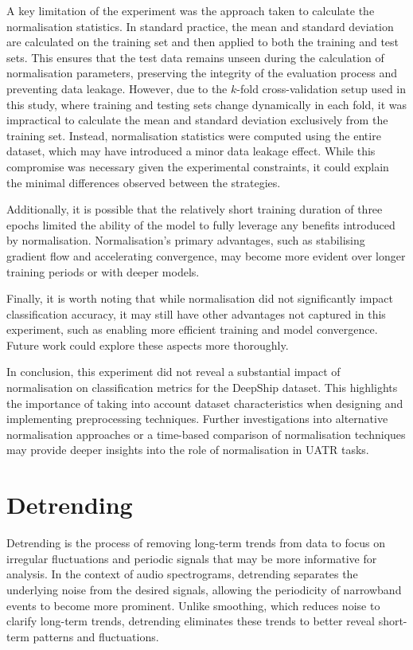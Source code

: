 A key limitation of the experiment was the approach taken to calculate the normalisation statistics. In standard practice, the mean and standard deviation are calculated on the training set and then applied to both the training and test sets. This ensures that the test data remains unseen during the calculation of normalisation parameters, preserving the integrity of the evaluation process and preventing data leakage. However, due to the $k$-fold cross-validation setup used in this study, where training and testing sets change dynamically in each fold, it was impractical to calculate the mean and standard deviation exclusively from the training set. Instead, normalisation statistics were computed using the entire dataset, which may have introduced a minor data leakage effect. While this compromise was necessary given the experimental constraints, it could explain the minimal differences observed between the strategies.

Additionally, it is possible that the relatively short training duration of three epochs limited the ability of the model to fully leverage any benefits introduced by normalisation. Normalisation's primary advantages, such as stabilising gradient flow and accelerating convergence, may become more evident over longer training periods or with deeper models.

Finally, it is worth noting that while normalisation did not significantly impact classification accuracy, it may still have other advantages not captured in this experiment, such as enabling more efficient training and model convergence. Future work could explore these aspects more thoroughly.

In conclusion, this experiment did not reveal a substantial impact of normalisation on classification metrics for the DeepShip dataset. This highlights the importance of taking into account dataset characteristics when designing and implementing preprocessing techniques. Further investigations into alternative normalisation approaches or a time-based comparison of normalisation techniques may provide deeper insights into the role of normalisation in UATR tasks.

\section{Detrending}

Detrending is the process of removing long-term trends from data to focus on irregular fluctuations and periodic signals that may be more informative for analysis. In the context of audio spectrograms, detrending separates the underlying noise from the desired signals, allowing the periodicity of narrowband events to become more prominent. Unlike smoothing, which reduces noise to clarify long-term trends, detrending eliminates these trends to better reveal short-term patterns and fluctuations.

